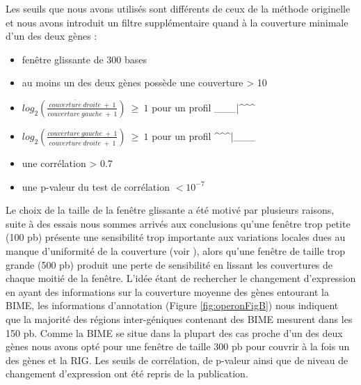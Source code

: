 \documentclass[12pt,a4paper]{report}
\begin{document}
\begin{onehalfspace}
Les seuils que nous avons utilisés sont différents de ceux de la méthode originelle et nous avons introduit un filtre supplémentaire quand à la couverture minimale d'un des deux gènes : 
\begin{itemize}[label=$\bullet$]
\item fenêtre glissante de 300 bases
\item au moins un des deux gènes possède une couverture > 10
\item $log_2(\frac{\overline{couverture~droite}~+~1}{\overline{couverture~gauche}~+~1})~\geq~1$ pour un profil \_\_\_|\^{ }\^{ }\^{ }
\item $log_2(\frac{\overline{couverture~gauche}~+~1}{\overline{couverture~droite}~+~1})~\geq~1$ pour un profil \^{ }\^{ }\^{ }|\_\_\_
\item une corrélation > 0.7
\item une p-valeur du test de corrélation $< 10^{-7}$
\end{itemize}

Le choix de la taille de la fenêtre glissante a été motivé par plusieurs raisons, suite à des essais nous sommes arrivés aux conclusions qu'une fenêtre trop petite (100 pb) présente une sensibilité trop importante aux variations locales dues au manque d'uniformité de la couverture (voir ), alors qu'une fenêtre de taille trop grande (500 pb) produit une perte de sensibilité en lissant les couvertures de chaque moitié de la fenêtre. L'idée étant de rechercher le changement d'expression en ayant des informations sur la couverture moyenne des gènes entourant la BIME, les informations d'annotation (Figure \autoref{fig:operonFigB}) nous indiquent que la majorité des régions inter-géniques contenant des BIME mesurent dans les 150 pb. Comme la BIME se situe dans la plupart des cas proche d'un des deux gènes nous avons opté pour une fenêtre de taille 300 pb pour couvrir à la fois un des gènes et la RIG. Les seuils de corrélation, de p-valeur ainsi que de niveau de changement d'expression ont été repris de la publication.


\end{onehalfspace}
\end{document}
